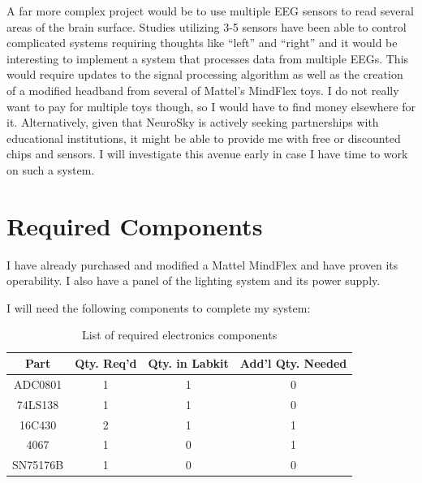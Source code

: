\documentclass[letterpaper,10pt,notitlepage]{report}
\begin{document}
    A far more complex project would be to use multiple EEG sensors to read 
    several areas of the brain surface.  Studies utilizing 3-5 sensors have 
    been able to control complicated systems requiring thoughts like ``left'' 
    and ``right'' and it would be interesting to implement a system that 
    processes data from multiple EEGs.  This would require updates to the 
    signal processing algorithm as well as the creation of a modified headband 
    from several of Mattel's MindFlex toys.  I do not really want to pay for 
    multiple toys though, so I would have to find money elsewhere for it.  
    Alternatively, given that NeuroSky is actively seeking partnerships with 
    educational institutions, it might be able to provide me with free or 
    discounted chips and sensors.  I will investigate this avenue early in 
    case I have time to work on such a system.

\section{Required Components}
    I have already purchased and modified a Mattel MindFlex and have proven its 
    operability.  I also have a panel of the lighting system and its power supply.

    I will need the following components to complete my system:

    \begin{table}[h!]
    \begin{center}
        \caption{List of required electronics components}

        \begin{tabular}{|c|c|c|c|}
            \hline
            \textbf{Part} & \textbf{Qty. Req'd} & \textbf{Qty. in Labkit} & 
            \textbf{Add'l Qty. Needed} \\
            \hline
            ADC0801 & 1 & 1 & 0 \\
            \hline
            74LS138 & 1 & 1 & 0 \\
            \hline
            16C430  & 2 & 1 & 1 \\
            \hline
            4067 & 1 & 0 & 1 \\
            \hline
            SN75176B & 1 & 0 & 0 \\
            \hline
        \end{tabular}
    \end{center}
    \end{table}
\end{document}
